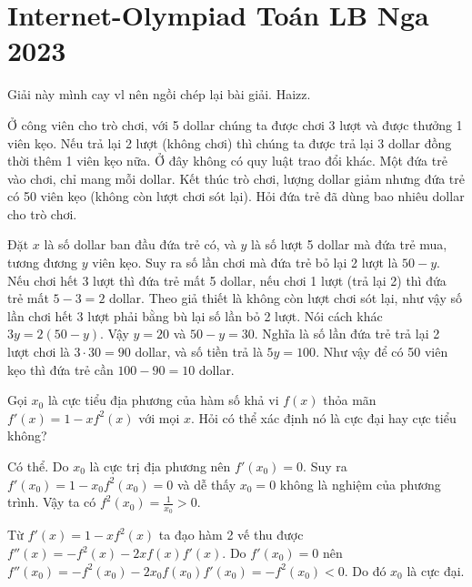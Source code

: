 \chapter{Internet-Olympiad Toán LB Nga 2023}

Giải này mình cay vl nên ngồi chép lại bài giải. Haizz.

\begin{problem}{1}
    Ở công viên cho trò chơi, với 5 dollar chúng ta được chơi 3 lượt
    và được thưởng 1 viên kẹo. Nếu trả lại 2 lượt (không chơi) thì
    chúng ta được trả lại 3 dollar đồng thời thêm 1 viên kẹo nữa.
    Ở đây không có quy luật trao đổi khác. Một đứa trẻ vào chơi,
    chỉ mang mỗi dollar. Kết thúc trò chơi, lượng dollar giảm
    nhưng đứa trẻ có 50 viên kẹo (không còn lượt chơi sót lại). 
    Hỏi đứa trẻ đã dùng bao nhiêu dollar cho trò chơi.
\end{problem}

\begin{solution}
    Đặt $x$ là số dollar ban đầu đứa trẻ có, và $y$ là số lượt
    5 dollar mà đứa trẻ mua, tương đương $y$ viên kẹo. Suy ra
    số lần chơi mà đứa trẻ bỏ lại 2 lượt là $50-y$. 
    Nếu chơi hết 3 lượt thì đứa trẻ
    mất 5 dollar, nếu chơi 1 lượt (trả lại 2) thì đứa trẻ mất 
    $5-3=2$ dollar. Theo giả thiết là không còn lượt chơi sót lại,
    như vậy số lần chơi hết 3 lượt phải bằng bù lại số lần bỏ 2 lượt.
    Nói cách khác $3y = 2(50-y)$. Vậy $y=20$ và $50-y=30$. Nghĩa
    là số lần đứa trẻ trả lại 2 lượt chơi là $3 \cdot 30 = 90$
    dollar, và số tiền trả là $5 y = 100$. Như vậy để có
    50 viên kẹo thì đứa trẻ cần $100 - 90 = 10$ dollar.
\end{solution}

\begin{problem}{2}
    Gọi $x_0$ là cực tiểu địa phương của hàm số khả vi $f(x)$ thỏa mãn
    $f'(x) = 1 - x f^2(x)$ với mọi $x$. 
    Hỏi có thể xác định nó là cực đại hay cực tiểu không?
\end{problem}

\begin{solution}
    Có thể. Do $x_0$ là cực trị địa phương nên $f'(x_0) = 0$.
    Suy ra $f'(x_0) = 1 - x_0 f^2(x_0) = 0$ và dễ thấy $x_0 = 0$
    không là nghiệm của phương trình. Vậy ta có $f^2(x_0) = \frac{1}{x_0} > 0$.

    Từ $f'(x) = 1 - x f^2(x)$ ta đạo hàm 2 vế thu được
    $f''(x) = -f^2(x) - 2xf(x) f'(x)$. Do $f'(x_0) = 0$ nên
    $f''(x_0) = -f^2(x_0) - 2x_0 f(x_0) f'(x_0) = -f^2(x_0) < 0$.
    Do đó $x_0$ là cực đại.
\end{solution}

